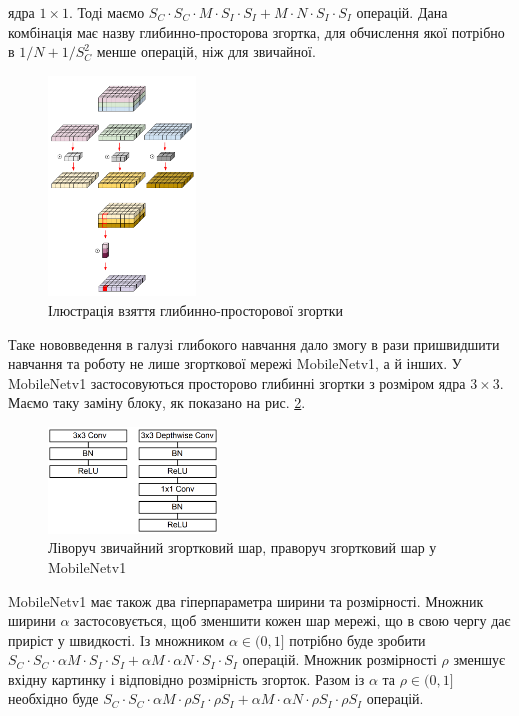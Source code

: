ядра $1 \times 1$. Тоді маємо
$S_C \cdot  S_C \cdot  M \cdot  S_I \cdot  S_I + M \cdot  N \cdot  S_I \cdot  S_I$ операцій.
Дана комбінація має назву глибинно-просторова згортка, для
обчислення якої потрібно в $1/N + 1/S_C^2$ менше операцій, ніж
для звичайної.
\begin{figure}[H]
    \centering
    \includegraphics[width=0.35\textwidth]{images/cnn_deep_wise_separable_conv}
    \caption{Ілюстрація взяття глибинно-просторової згортки  \cite{deep_wise_sep_conv_website}
        \label{fig:cnn:deep_wise_sep_conv}
    }
\end{figure}

Таке нововведення в галузі глибокого навчання дало змогу в рази пришвидшити
навчання та роботу не лише згорткової мережі MobileNetv1, а й інших. У MobileNetv1 застосовуються
просторово глибинні згортки з розміром ядра $3 \times 3$.
Маємо таку заміну блоку, як показано на рис. \ref{fig:cnn:mobilenetv1_conv_layer}.

\begin{figure}[H]
    \centering
    \includegraphics[width=0.4\textwidth]{images/cnn_mobilenetv1_conv_layer}
    \caption{Ліворуч звичайний згортковий шар,
        праворуч згортковий шар у MobileNetv1  \cite{mobilenetv1}
        \label{fig:cnn:mobilenetv1_conv_layer}
    }
\end{figure}

MobileNetv1 має також два гіперпараметра ширини та розмірності.
Множник ширини $\alpha$ застосовується, щоб зменшити кожен шар мережі, що
в свою чергу дає приріст у швидкості.
Iз множником  $\alpha \in (0,1]$ потрібно буде зробити
$S_C \cdot  S_C \cdot  \alpha M \cdot  S_I \cdot  S_I + \alpha M \cdot  \alpha N \cdot  S_I \cdot  S_I$ операцій.
Множник розмірності $\rho$ зменшує вхідну картинку і відповідно
розмірність згорток. Разом із $\alpha$ та $\rho \in (0,1]$ необхідно буде
$S_C \cdot  S_C \cdot  \alpha M \cdot  \rho S_I \cdot  \rho S_I + \alpha M \cdot \alpha  N \cdot  \rho S_I \cdot  \rho S_I$
операцій.

